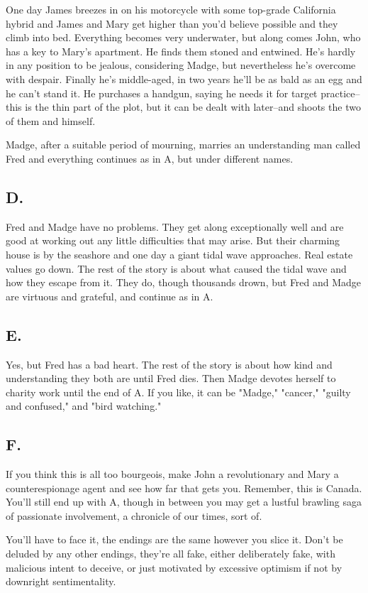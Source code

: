 \documentclass[10pt,a4paper]{article}
\begin{document}
One day James breezes in on his motorcycle with some top-grade California hybrid and James and Mary get higher than you'd believe possible and they climb into bed. Everything becomes very underwater, but along comes John, who has a key to Mary's apartment. He finds them stoned and entwined. He's hardly in any position to be jealous, considering Madge, but nevertheless he's overcome with despair. Finally he's middle-aged, in two years he'll be as bald as an egg and he can't stand it. He purchases a handgun, saying he needs it for target practice-- this is the thin part of the plot, but it can be dealt with later--and shoots the two of them and himself. 

Madge, after a suitable period of mourning, marries an understanding man called Fred and everything continues as in A, but under different names.

\subsection{D.}
Fred and Madge have no problems. They get along exceptionally well and are good at working out any little difficulties that may arise. But their charming house is by the seashore and one day a giant tidal wave approaches. Real estate values go down. The rest of the story is about what caused the tidal wave and how they escape from it. They do, though thousands drown, but Fred and Madge are virtuous and grateful, and continue as in A.

\subsection{E.}
Yes, but Fred has a bad heart. The rest of the story is about how kind and understanding they both are until Fred dies. Then Madge devotes herself to charity work until the end of A. If you like, it can be "Madge," "cancer," "guilty and confused," and "bird watching." 

\subsection{F.}
If you think this is all too bourgeois, make John a revolutionary and Mary a counterespionage agent and see how far that gets you. Remember, this is Canada. You'll still end up with A, though in between you may get a lustful brawling saga of passionate involvement, a chronicle of our times, sort of. 

You'll have to face it, the endings are the same however you slice it. Don't be deluded by any other endings, they're all fake, either deliberately fake, with malicious intent to deceive, or just motivated by excessive optimism if not by downright sentimentality.
\end{document}
